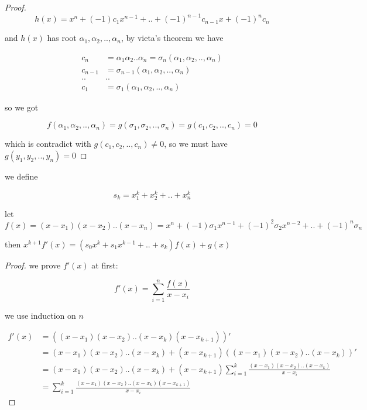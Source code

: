 \begin{proof}
    \[
        h(x) = x^n + (-1)c_1x^{n-1} + .. + (-1)^{n-1}c_{n-1}x + (-1)^n c_n
    \]

    and $h(x)$ has root $\alpha_1,\alpha_2,..,\alpha_n$, by vieta's theorem we have

    \begin{align*}
        c_n &=  \alpha_1\alpha_2..\alpha_n = \sigma_n(\alpha_1,\alpha_2,..,\alpha_n) \\
        c_{n-1} &=  \sigma_{n-1}(\alpha_1,\alpha_2,..,\alpha_n) \\
        .. & .. \\
        c_{1} &= \sigma_{1}(\alpha_1,\alpha_2,..,\alpha_n)
    \end{align*}

    so we got

    \[
        f(\alpha_1,\alpha_2,..,\alpha_n) = g(\sigma_1,\sigma_2,..,\sigma_n) = g(c_1, c_2,..,c_n) = 0
    \]

    which is contradict with $g(c_1,c_2,..,c_n) \ne 0$, so we must have $g(y_1,y_2,..,y_n) = 0$

\end{proof}

\begin{exercise}
    we define

    \[
        s_k = x_1^k + x_2^k + .. +x_n^k
    \]

    let $f(x) = (x-x_1)(x-x_2)..(x-x_n) = x^n + (-1)\sigma_1x^{n-1} + (-1)^2\sigma_2x^{n-2} + .. +(-1)^n \sigma_n$

    then $x^{k+1}f'(x) = (s_0x^k + s_1x^{k-1} + .. + s_k)f(x) + g(x)$
\end{exercise}

\begin{proof}
    we prove $f'(x)$ at first:

    \[
        f'(x) = \sum_{i=1}^{n}\frac{f(x)}{x-x_i}
    \]

    we use induction on $n$

    \begin{align*}
        f'(x) &= \left((x-x_1)(x-x_2)..(x-x_k)(x-x_{k+1}) \right)' \\
        &= (x-x_1)(x-x_2)..(x-x_k) + (x-x_{k+1})\left((x-x_1)(x-x_2)..(x-x_k) \right)' \\
        &= (x-x_1)(x-x_2)..(x-x_k) + (x-x_{k+1})\sum_{i=1}^{k}\frac{(x-x_1)(x-x_2)..(x-x_k)}{x-x_i} \\
        &= \sum_{i=1}^{k}\frac{(x-x_1)(x-x_2)..(x-x_k)(x-x_{k+1})}{x-x_i}
    \end{align*}
\end{proof}